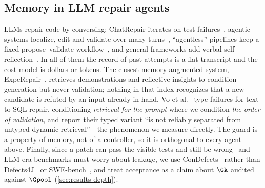 \ifsuppmatter\else\fi

\subsection{Memory in LLM repair agents}
LLMs repair code by conversing: ChatRepair iterates on test
failures~\cite{xia2024chatrepair}, agentic systems localize, edit and validate
over many turns~\cite{bouzenia2025repairagent,zhang2024autocoderover,%
yang2024sweagent}, ``agentless'' pipelines keep a fixed propose--validate
workflow~\cite{xia2025agentless}, and general frameworks add verbal
self-reflection~\cite{shinn2023reflexion,chen2024selfdebug}. In all of them the
record of past attempts is a flat transcript and the cost model is dollars or
tokens. The closest memory-augmented system,
ExpeRepair~\cite{mu2026experepair}, retrieves demonstrations and reflective
insights to condition generation but never validation; nothing in that index
recognizes that a new candidate is refuted by an input already in hand. Vo et
al.~\cite{vo2026merit} type failures for text-to-SQL repair, conditioning
\emph{retrieval for the prompt} where we condition \emph{the order of
validation}, and report their typed variant ``is not reliably separated from
untyped dynamic retrieval''---the phenomenon we measure directly. The guard is
a property of memory, not of a controller, so it is orthogonal to every agent
above. Finally, since a patch can pass the visible tests and still be
wrong~\cite{xiong2018patchsim} and
LLM-era benchmarks must worry about leakage, we use
ConDefects~\cite{wu2024condefects} rather than
Defects4J~\cite{just2014defects4j} or SWE-bench~\cite{jimenez2024swebench}, and
treat acceptance as a claim about $\Gk$ audited against $\Gpool$
(\cref{sec:results-depth}).
